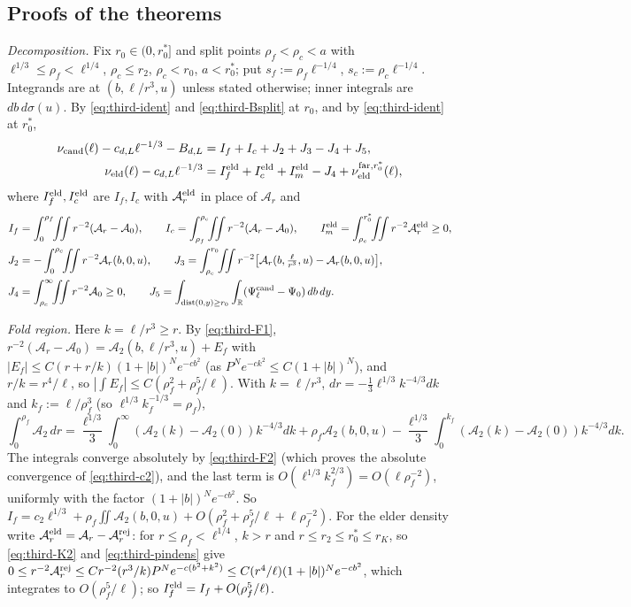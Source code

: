 \subsection{Proofs of the theorems}\label{ssec:third-proofs}

\emph{Decomposition.} Fix $r_0\in(0,r_0^*]$ and split points $\rho_f<\rho_c<a$ with $\ell^{1/3}\le\rho_f<\ell^{1/4}$, $\rho_c\le r_2$, $\rho_c<r_0$, $a<r_0^*$; put $s_f:=\rho_f\ell^{-1/4}$, $s_c:=\rho_c\ell^{-1/4}$. Integrands are at $(b,\ell/r^3,u)$ unless stated otherwise; inner integrals are $db\,d\sigma(u)$. By \eqref{eq:third-ident} and \eqref{eq:third-Bsplit} at $r_0$, and by \eqref{eq:third-ident} at $r_0^*$,
\begin{align}
\nu_{\mathrm{cand}}(\ell)-c_{d,L}\ell^{-1/3}-B_{d,L}&=I_f+I_c+J_2+J_3-J_4+J_5,\label{eq:third-decT}\\
\nu_{\mathrm{eld}}(\ell)-c_{d,L}\ell^{-1/3}&=I^{\mathrm{eld}}_f+I^{\mathrm{eld}}_c+I^{\mathrm{eld}}_m-J_4+\nu_{\mathrm{eld}}^{{\rm far},r_0^*}(\ell),\label{eq:third-decE}
\end{align}
where $I^{\mathrm{eld}}_f,I^{\mathrm{eld}}_c$ are $I_f,I_c$ with $\mathcal A^{\mathrm{eld}}_r$ in place of $\mathcal A_r$ and
\[
\begin{aligned}
I_f&=\int_0^{\rho_f}\!\!\iint r^{-2}(\mathcal A_r-\mathcal A_0),\qquad I_c=\int_{\rho_f}^{\rho_c}\!\!\iint r^{-2}(\mathcal A_r-\mathcal A_0),\qquad I^\eld_m=\int_{\rho_c}^{r_0^*}\!\!\iint r^{-2}\mathcal A^\eld_r\ge0,\\
J_2&=-\int_0^{\rho_c}\!\!\iint r^{-2}\mathcal A_r(b,0,u),\qquad J_3=\int_{\rho_c}^{r_0}\!\!\iint r^{-2}\bigl[\mathcal A_r(b,\tfrac\ell{r^3},u)-\mathcal A_r(b,0,u)\bigr],\\
J_4&=\int_{\rho_c}^\infty\!\!\iint r^{-2}\mathcal A_0\ge0,\qquad J_5=\int_{\dist(0,y)\ge r_0}\int_\R(\Psi^\cand_\ell-\Psi_0)\,db\,dy.
\end{aligned}
\]

\emph{Fold region.} Here $k=\ell/r^3\ge r$. By \eqref{eq:third-F1}, $r^{-2}(\mathcal A_r-\mathcal A_0)=\mathcal A_2(b,\ell/r^3,u)+E_f$ with $|E_f|\le C(r+r/k)(1+|b|)^Ne^{-cb^2}$ (as $P^Ne^{-ck^2}\le C(1+|b|)^N$), and $r/k=r^4/\ell$, so $|\int E_f|\le C(\rho_f^2+\rho_f^5/\ell)$. With $k=\ell/r^3$, $dr=-\frac13\ell^{1/3}k^{-4/3}dk$ and $k_f:=\ell/\rho_f^3$ (so $\ell^{1/3}k_f^{-1/3}=\rho_f$),
\[
\int_0^{\rho_f}\!\mathcal A_2\,dr=\frac{\ell^{1/3}}3\int_0^\infty\!(\mathcal A_2(k)-\mathcal A_2(0))k^{-4/3}dk+\rho_f\mathcal A_2(b,0,u)-\frac{\ell^{1/3}}3\int_0^{k_f}\!(\mathcal A_2(k)-\mathcal A_2(0))k^{-4/3}dk.
\]
The integrals converge absolutely by \eqref{eq:third-F2} (which proves the absolute convergence of \eqref{eq:third-c2}), and the last term is $O(\ell^{1/3}k_f^{2/3})=O(\ell\rho_f^{-2})$, uniformly with the factor $(1+|b|)^Ne^{-cb^2}$. So $I_f=c_2\ell^{1/3}+\rho_f\iint \mathcal A_2(b,0,u)+O(\rho_f^2+\rho_f^5/\ell+\ell\rho_f^{-2})$. For the elder density write $\mathcal A^{\mathrm{eld}}_r=\mathcal A_r-\mathcal A^{\mathrm{rej}}_r$: for $r\le\rho_f<\ell^{1/4}$, $k>r$ and $r\le r_2\le r_0^*\le r_K$, so \eqref{eq:third-K2} and \eqref{eq:third-pindens} give $0\le r^{-2}\mathcal A^{\mathrm{rej}}_r\le Cr^{-2}(r^3/k)P^Ne^{-c(b^2+k^2)}\le C(r^4/\ell)(1+|b|)^Ne^{-cb^2}$, which integrates to $O(\rho_f^5/\ell)$; so $I^{\mathrm{eld}}_f=I_f+O(\rho_f^5/\ell)$.

